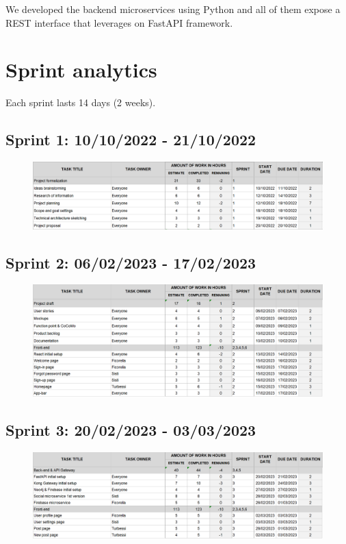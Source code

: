 \documentclass[11pt, a4paper]{article}
\begin{document}
We developed the backend microservices using Python and all of them expose a REST interface that leverages on FastAPI framework. 


\newpage

\section{Sprint analytics}
Each sprint lasts 14 days (2 weeks).
\subsection{Sprint 1: 10/10/2022 - 21/10/2022}
\begin{figure}[H]
    \centering
    \includegraphics[width=1\textwidth]{images/sprint1.png}
\end{figure}
\subsection{Sprint 2: 06/02/2023 - 17/02/2023}
\begin{figure}[H]
    \centering
    \includegraphics[width=1\textwidth]{images/sprint2.png}
\end{figure}
\subsection{Sprint 3: 20/02/2023 - 03/03/2023}
\begin{figure}[H]
    \centering
    \includegraphics[width=1\textwidth]{images/sprint3.png}
\end{figure}
\end{document}

